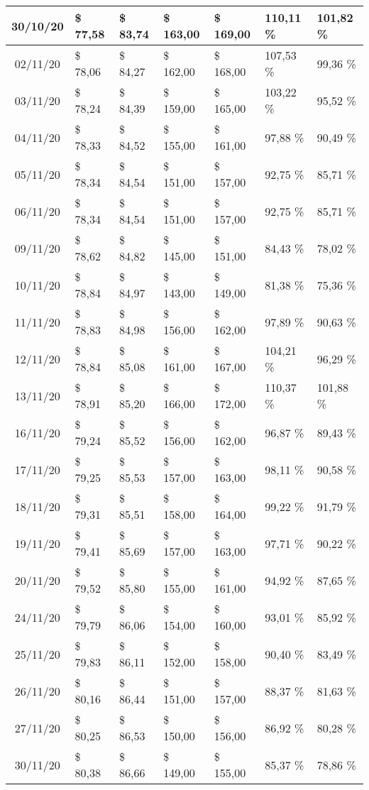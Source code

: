 \begin{center}
\begin{longtable}{|c|p{1.5cm}|p{1.5cm}|p{1.5cm}|p{1.5cm}|p{1.5cm}|p{1.5cm}|}
30/10/20 & \$ 77,58 & \$ 83,74 & \$ 163,00 & \$ 169,00 & 110,11 \% & 101,82 \% \\ \hline
02/11/20 & \$ 78,06 & \$ 84,27 & \$ 162,00 & \$ 168,00 & 107,53 \% & 99,36 \% \\ \hline
03/11/20 & \$ 78,24 & \$ 84,39 & \$ 159,00 & \$ 165,00 & 103,22 \% & 95,52 \% \\ \hline
04/11/20 & \$ 78,33 & \$ 84,52 & \$ 155,00 & \$ 161,00 & 97,88 \% & 90,49 \% \\ \hline
05/11/20 & \$ 78,34 & \$ 84,54 & \$ 151,00 & \$ 157,00 & 92,75 \% & 85,71 \% \\ \hline
06/11/20 & \$ 78,34 & \$ 84,54 & \$ 151,00 & \$ 157,00 & 92,75 \% & 85,71 \% \\ \hline
09/11/20 & \$ 78,62 & \$ 84,82 & \$ 145,00 & \$ 151,00 & 84,43 \% & 78,02 \% \\ \hline
10/11/20 & \$ 78,84 & \$ 84,97 & \$ 143,00 & \$ 149,00 & 81,38 \% & 75,36 \% \\ \hline
11/11/20 & \$ 78,83 & \$ 84,98 & \$ 156,00 & \$ 162,00 & 97,89 \% & 90,63 \% \\ \hline
12/11/20 & \$ 78,84 & \$ 85,08 & \$ 161,00 & \$ 167,00 & 104,21 \% & 96,29 \% \\ \hline
13/11/20 & \$ 78,91 & \$ 85,20 & \$ 166,00 & \$ 172,00 & 110,37 \% & 101,88 \% \\ \hline
16/11/20 & \$ 79,24 & \$ 85,52 & \$ 156,00 & \$ 162,00 & 96,87 \% & 89,43 \% \\ \hline
17/11/20 & \$ 79,25 & \$ 85,53 & \$ 157,00 & \$ 163,00 & 98,11 \% & 90,58 \% \\ \hline
18/11/20 & \$ 79,31 & \$ 85,51 & \$ 158,00 & \$ 164,00 & 99,22 \% & 91,79 \% \\ \hline
19/11/20 & \$ 79,41 & \$ 85,69 & \$ 157,00 & \$ 163,00 & 97,71 \% & 90,22 \% \\ \hline
20/11/20 & \$ 79,52 & \$ 85,80 & \$ 155,00 & \$ 161,00 & 94,92 \% & 87,65 \% \\ \hline
24/11/20 & \$ 79,79 & \$ 86,06 & \$ 154,00 & \$ 160,00 & 93,01 \% & 85,92 \% \\ \hline
25/11/20 & \$ 79,83 & \$ 86,11 & \$ 152,00 & \$ 158,00 & 90,40 \% & 83,49 \% \\ \hline
26/11/20 & \$ 80,16 & \$ 86,44 & \$ 151,00 & \$ 157,00 & 88,37 \% & 81,63 \% \\ \hline
27/11/20 & \$ 80,25 & \$ 86,53 & \$ 150,00 & \$ 156,00 & 86,92 \% & 80,28 \% \\ \hline
30/11/20 & \$ 80,38 & \$ 86,66 & \$ 149,00 & \$ 155,00 & 85,37 \% & 78,86 \% \\ \hline

\end{longtable}
\end{center}
